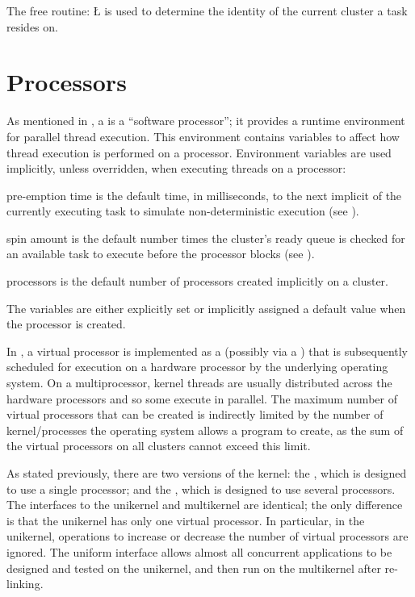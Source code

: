 \documentclass[openright,twoside]{report}
\begin{document}
The free routine:
\LGinlinefalse\LGbegin\lgrinde
\L{}
\endlgrinde\LGend
{}%
is used to determine the identity of the current cluster a task resides on.


\section{Processors}
\label{s:Processors}

As mentioned in , a \uC {} is a ``software processor'';
it provides a runtime environment for parallel thread execution.
This environment contains variables to affect how thread execution is performed on a processor.
Environment variables are used implicitly, unless overridden, when executing threads on a processor:
\begin{prefix}
\item[pre-emption time]
is the default time, in milliseconds, to the next implicit  of the currently executing task to simulate non-deterministic execution (see ).
\item[spin amount]
is the default number times the cluster's ready queue is checked for an available task to execute before the processor blocks (see ).
\item[processors]
is the default number of processors created implicitly on a cluster.
\end{prefix}
The variables are either explicitly set or implicitly assigned a \uC default value when the processor is created.

In \uC, a virtual processor is implemented as a  (possibly via a ) that is subsequently scheduled for execution on a hardware processor by the underlying operating system.
On a multiprocessor, kernel threads are usually distributed across the hardware processors and so some execute in parallel.
The maximum number of virtual processors that can be created is indirectly limited by the number of kernel/processes the operating system allows a program to create, as the sum of the virtual processors on all clusters cannot exceed this limit.

As stated previously, there are two versions of the \uC kernel:
the , which is designed to use a single processor;
and the , which is designed to use several processors.
The interfaces to the unikernel and multikernel are identical;
the only difference is that the unikernel has only one virtual processor.
In particular, in the unikernel, operations to increase or decrease the number of virtual processors are ignored.
The uniform interface allows almost all concurrent applications to be designed and tested on the unikernel, and then run on the multikernel after re-linking.
\end{document}
